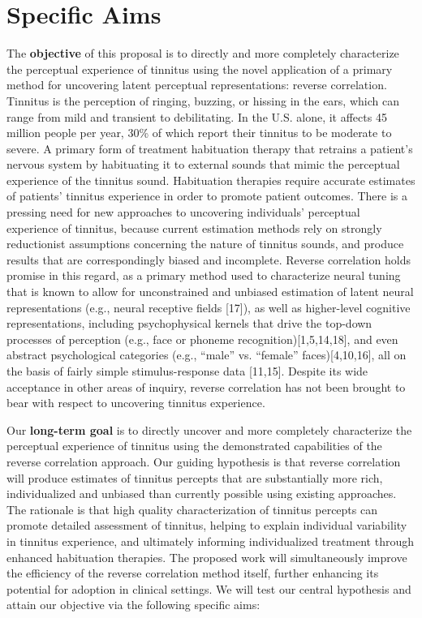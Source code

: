 \documentclass[11pt, notitlepage]{article} %
\begin{document}

\section*{Specific Aims}

The \textbf{objective} of this proposal is to directly and more completely characterize the perceptual experience of tinnitus using the novel application of a primary method for uncovering latent perceptual representations: reverse correlation.
Tinnitus is the perception of ringing, buzzing, or hissing in the ears, which can range from mild and transient to debilitating.
In the U.S. alone, it affects 45 million people per year, 30\% of which report their tinnitus to be moderate to severe.
A primary form of treatment habituation therapy that retrains a patient’s nervous system by habituating it to external sounds that mimic the perceptual experience of the tinnitus sound.
Habituation therapies require accurate estimates of patients’ tinnitus experience in order to promote patient outcomes.
There is a pressing need for new approaches to uncovering individuals’ perceptual experience of tinnitus, because current estimation methods rely on strongly reductionist assumptions concerning the nature of tinnitus sounds, and produce results that are correspondingly biased and incomplete. Reverse correlation holds promise in this regard, as a primary method used to characterize neural tuning that is known to allow for unconstrained and unbiased estimation of latent neural representations (e.g., neural receptive fields [17]), as well as higher-level cognitive representations, including psychophysical kernels that drive the top-down processes of perception (e.g., face or phoneme recognition)[1,5,14,18], and even abstract psychological categories (e.g., “male” vs. “female” faces)[4,10,16], all on the basis of fairly simple stimulus-response data [11,15]. Despite its wide acceptance in other areas of inquiry, reverse correlation has not been brought to bear with respect to uncovering tinnitus experience.

Our \textbf{long-term goal} is to directly uncover and more completely characterize the perceptual experience of tinnitus using the demonstrated capabilities of the reverse correlation approach.
Our guiding hypothesis is that reverse correlation will produce estimates of tinnitus percepts that are substantially more rich, individualized and unbiased than currently possible using existing approaches. The rationale is that high quality characterization of tinnitus percepts can promote detailed assessment of tinnitus, helping to explain individual variability in tinnitus experience, and ultimately informing individualized treatment through enhanced habituation therapies. The proposed work will simultaneously improve the efficiency of the reverse correlation method itself, further enhancing its potential for adoption in clinical settings. We will test our central hypothesis and attain our objective via the following specific aims:
\end{document}
